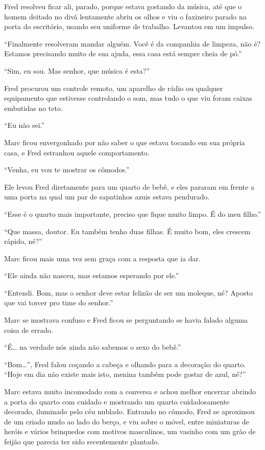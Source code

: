 Fred resolveu ficar ali, parado, porque estava gostando da música, até
que o homem deitado no divã lentamente abriu os olhos e viu o faxineiro
parado na porta do escritório, usando seu uniforme de trabalho. Levantou
em um impulso.

``Finalmente resolveram mandar alguém. Você é da companhia de limpeza,
não é? Estamos precisando muito de sua ajuda, essa casa está sempre
cheia de pó.''

``Sim, eu sou. Mas senhor, que música é esta?''

Fred procurou um
controle remoto, um aparelho de rádio ou qualquer equipamento que
estivesse controlando o som, mas tudo o que viu foram caixas embutidas
no teto.

``Eu não sei.''

Marc ficou envergonhado por não saber o que estava tocando em
sua própria casa, e Fred estranhou aquele comportamento.

``Venha, eu vou te mostrar os cômodos.''

Ele levou Fred diretamente para um quarto de bebê, e eles pararam em
frente a uma porta na qual um par de sapatinhos azuis estava pendurado.

``Esse é o quarto mais importante, preciso que fique muito limpo. É do
meu filho.''

``Que massa, doutor. Eu também tenho duas filhas. É muito bom, eles
crescem rápido, né?''

Marc ficou mais uma vez sem graça com a resposta que ia dar.

``Ele ainda não nasceu, mas estamos esperando por ele.''

``Entendi. Bom, mas o senhor deve estar felizão de ser um moleque, né?
Aposto que vai torcer pro time do senhor.''

Marc se mostrava confuso e Fred ficou se perguntando se havia falado
alguma coisa de errado.

``É\ldots{} na verdade nós ainda não sabemos o sexo do bebê.''

``Bom\ldots{}'', Fred falou coçando a cabeça e olhando para a decoração do
quarto. ``Hoje em dia não existe mais isto, menina também pode gostar de
azul, né?''

Marc estava muito incomodado com a conversa e achou melhor encerrar
abrindo a porta do quarto com cuidado e mostrando um quarto
cuidadosamente decorado, iluminado pelo céu nublado. Entrando no cômodo, Fred se
aproximou de um criado mudo ao lado do berço, e viu sobre o móvel, entre
miniaturas de heróis e vários brinquedos com motivos masculinos, um
vasinho com um grão de feijão que parecia ter sido recentemente
plantado.

